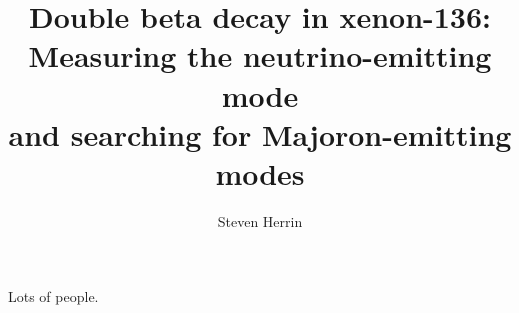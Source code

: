 \documentclass[12pt,twoside]{report}
\begin{document}
\title{Double beta decay in xenon-136:\\
	 Measuring the neutrino-emitting mode\\
	 and searching for Majoron-emitting modes}
\author{Steven Herrin}
 
\beforepreface



Lots of people.

\afterpreface
 














\appendix




\printbibliography

\onlinesignature
\end{document}
